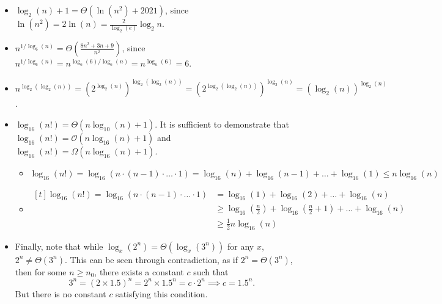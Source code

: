 \documentclass{article}
\begin{document}
\begin{enumerate}
\begin{itemize}
            \item $\log_{2}(n) + 1 = \Theta(\ln(n^{2}) + 2021)$, since $\ln(n^{2}) = 2\ln(n) = \frac{2}{\log_{2}(e)}\log_{2}{n}$.
            \item $n^{1/\log_{6}(n)} = \Theta(\frac{8n^{2} + 3n + 9}{n^{2}})$, since $n^{1/\log_{6}(n)} = n^{\log_{6}(6) / \log_{6}(n)} = n^{\log_{n}(6)} = 6$.
            \item $n^{\log_{2}(\log_{2}(n))} = (2^{\log_{2}(n)})^{\log_{2}(\log_{2}(n))} = (2^{\log_{2}(\log_{2}(n))})^{\log_{2}(n)} = (\log_{2}(n))^{\log_{2}(n)}$.
            \item $\log_{16}(n!) = \Theta(n\log_{10}(n) + 1)$. It is sufficient to demonstrate that $\log_{16}(n!) = \mathcal{O}(n\log_{16}(n) + 1)$ and $\log_{16}(n!) = \Omega(n\log_{16}(n) + 1)$.
            \begin{itemize}
                \item $\log_{16}(n!) = \log_{16}(n \cdot (n - 1) \cdot \dots \cdot 1) = \log_{16}(n) + \log_{16}(n - 1) + \dots + \log_{16}(1) \le n\log_{16}(n)$
                \item
                $\begin{aligned}[t]
                    \log_{16}(n!) = \log_{16}(n \cdot (n - 1) \cdot \dots \cdot 1) &= \log_{16}(1) + \log_{16}(2) + \dots + \log_{16}(n)  \\
                    &\textstyle \ge \log_{16}(\frac{n}{2}) + \log_{16}(\frac{n}{2} + 1) + \dots + \log_{16}(n) \\
                    &\textstyle \ge \frac{1}{2}n\log_{16}(n)
                \end{aligned}$
            \end{itemize}
            \item Finally, note that while $\log_{x}(2^{n}) = \Theta(\log_{x}(3^{n}))$ for any $x$, $2^{n} \ne \Theta(3^{n})$. This can be seen through contradiction, as if $2^{n} = \Theta(3^{n})$, then for some $n \ge n_{0}$, there exists a constant $c$ such that $$3^{n} = (2 \times 1.5)^{n} = 2^{n} \times 1.5^{n} = c \cdot 2^{n} \implies c = 1.5^{n}.$$ But there is no constant $c$ satisfying this condition.
        \end{itemize}
    \end{enumerate}
\end{document}
